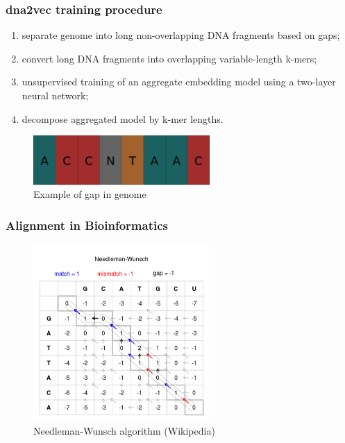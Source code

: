 \documentclass[11pt,xcolor=x11names,compress]{beamer}
\renewcommand{\(}{\begin{columns}}
\renewcommand{\)}{\end{columns}}
\newcommand{\<}[1]{\begin{column}{#1}}
\renewcommand{\>}{\end{column}}
\begin{document}
\begin{frame}
	\frametitle{dna2vec training procedure}
	\begin{enumerate}
		\item separate genome into long non-overlapping DNA fragments based on gaps;
		\item convert long DNA fragments into overlapping variable-length k-mers;
		\item unsupervised training of an aggregate embedding model using a two-layer neural network;
		\item decompose aggregated model by k-mer lengths.
	\end{enumerate}
	
	\begin{figure}
		\includegraphics[width=0.6\textwidth]{gap.png}
		\caption*{\tiny{Example of gap in genome}}
	\end{figure}
\end{frame}

\begin{frame}
	\frametitle{Alignment in Bioinformatics}
	\begin{figure}
		\includegraphics[width=0.6\textwidth]{NW.png}
		\caption*{\tiny{Needleman-Wunsch algorithm (Wikipedia)}}
	\end{figure}
\end{frame}
\end{document}
